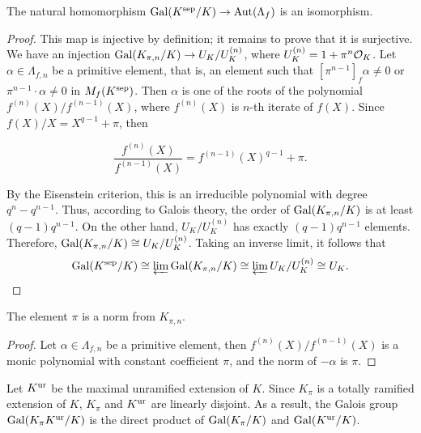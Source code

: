 \begin{theorem}
    The natural homomorphism $\mathrm{Gal}(K^{\mathrm{sep}}/K) \to \mathrm{Aut} (\Lambda_f)$ is an isomorphism.
\end{theorem}

\begin{proof}
    This map is injective by definition; it remains to prove that it is surjective.
    We have an injection $\mathrm{Gal}(K_{\pi,n}/ K) \to U_K/ U_K^{(n)}$, where $U_K^{(n)} = 1 + \pi ^ n \mathcal{O}_K$.
    Let $\alpha \in \Lambda_{f,n}$ be a primitive element, that is, an element such that
    $[\pi ^ {n - 1}]_f \alpha \neq 0$ or $\pi ^ {n - 1} \cdot \alpha \neq 0$ in $M_f(K^{\mathrm{sep}})$.
    Then $\alpha$ is one of the roots of the polynomial $f^{(n)}(X)/ f^{(n-1)}(X)$,
    where $f^{(n)}(X)$ is $n$-th iterate of $f(X)$.
    Since $f(X)/X = X ^ {q -1} + \pi$, then

    \[ \frac{f^{(n)}(X)}{f ^ {(n -1)}(X)} = f^ {(n -1)}(X)^{q-1} + \pi. \]

    By the Eisenstein criterion, this is an irreducible polynomial with degree $q ^ n - q ^{n -1}$.
    Thus, according to Galois theory, the order of $\mathrm{Gal}(K_{\pi,n}/ K)$ is at least
    $(q-1) q ^ {n-1}$. On the other hand, $U_K/ U_K^{(n)}$ has exactly $(q-1)q ^ {n -1}$
    elements. Therefore, $\mathrm{Gal}(K_{\pi,n}/K) \cong U_K/ U_K^{(n)}$.
    Taking an inverse limit, it follows that
    \[ \mathrm{Gal}(K^{\mathrm{sep}}/K) \cong \varprojlim \mathrm{Gal}(K_{\pi,n}/ K) \cong \varprojlim U_K / U_K^{(n)} \cong U_K. \]
\end{proof}

\begin{corollary}
    The element $\pi$ is a norm from $K_{\pi,n}$.

    \label{cor: norm_Lpi}
\end{corollary}

\begin{proof}
    Let $\alpha \in \Lambda_{f,n}$ be a primitive element, then $f^{(n)}(X)/ f^{(n-1)}(X)$ is a
    monic polynomial with constant coefficient $\pi$, and the norm of $-\alpha$ is $\pi$.
\end{proof}

Let $K^{\mathrm{ur}}$ be the maximal unramified extension of $K$. Since $K_\pi$ is a totally ramified extension
of $K$, $K_\pi$ and $K^{\mathrm{ur}}$ are linearly disjoint. As a result, the Galois group
$\mathrm{Gal}(K_\pi K^{\mathrm{ur}}/K)$ is the direct product of $\mathrm{Gal}(K_\pi/K)$ and $\mathrm{Gal}(K^{\mathrm{ur}}/K)$.

